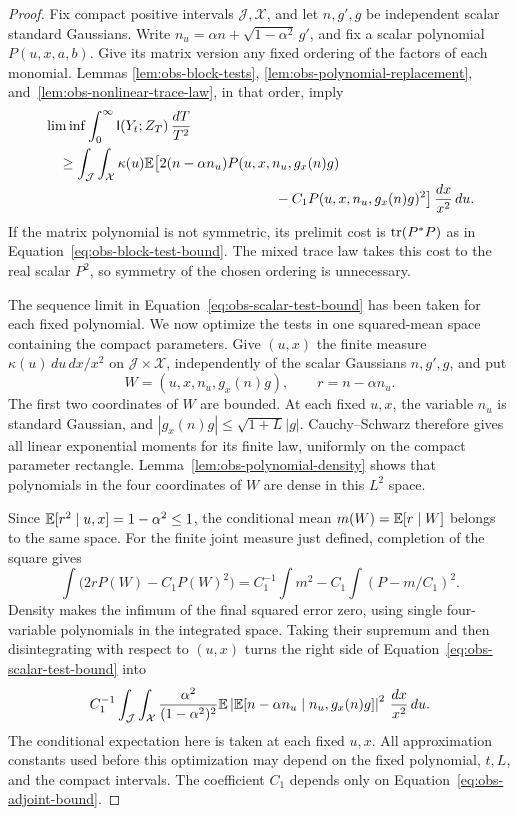 \begin{proof}
Fix compact positive intervals $\mathcal J,\mathcal X$, and let
$n,g',g$ be independent scalar standard Gaussians.  Write
$n_u=\alpha n+\sqrt{1-\alpha^2}\,g'$, and fix a scalar polynomial
$P(u,x,a,b)$.  Give its matrix version any fixed
ordering of the factors of each monomial.  Lemmas
\ref{lem:obs-block-tests}, \ref{lem:obs-polynomial-replacement},
and~\ref{lem:obs-nonlinear-trace-law}, in that order, imply
\begin{align}
 &\liminf\int_0^\infty\MI(Y_t;Z_T)\,\frac{dT}{T^2}
 \notag\\
 &\quad\ge\int_{\mathcal J}\int_{\mathcal X}\kappa(u)
 \E\big[2(n-\alpha n_u)P(u,x,n_u,g_x(n)g)
 \notag\\[-2pt]
 &\hspace{58mm}-C_1P(u,x,n_u,g_x(n)g)^2\big]
       \,\frac{dx}{x^2}\,du.
 \label{eq:obs-scalar-test-bound}
\end{align}
If the matrix polynomial is not symmetric, its prelimit cost is
$\operatorname{tr}(P^*P)$ as in Equation~\eqref{eq:obs-block-test-bound}.
The mixed trace law takes this cost to the real scalar $P^2$,
so symmetry of the chosen ordering is unnecessary.

The sequence limit in Equation~\eqref{eq:obs-scalar-test-bound}
has been taken for each fixed polynomial.  We now optimize the
tests in one squared-mean space containing the compact parameters.
Give $(u,x)$ the finite measure $\kappa(u)\,du\,dx/x^2$ on
$\mathcal J\times\mathcal X$, independently of the scalar
Gaussians $n,g',g$, and put
\begin{equation}\label{eq:obs-scalar-observed-vector}
 W=(u,x,n_u,g_x(n)g),\qquad r=n-\alpha n_u.
\end{equation}
The first two coordinates of $W$ are bounded.  At each fixed
$u,x$, the variable $n_u$ is standard Gaussian, and
$|g_x(n)g|\le\sqrt{1+L}|g|$.
Cauchy--Schwarz therefore gives all linear exponential moments
for its finite law, uniformly on the compact parameter rectangle.
Lemma~\ref{lem:obs-polynomial-density} shows that polynomials in
the four coordinates of $W$ are dense in this $L^2$ space.

Since $\mathbb E[r^2\mid u,x]=1-\alpha^2\le1$, the conditional mean
$m(W)=\mathbb E[r\mid W]$ belongs to the same space.  For the finite
joint measure just defined, completion of the square gives
\[
 \int\big(2rP(W)-C_1P(W)^2\big)
 =C_1^{-1}\int m^2-C_1\int(P-m/C_1)^2.
\]
Density makes the infimum of the final squared error zero, using
single four-variable polynomials in the integrated space.
Taking their supremum and then disintegrating with respect to
$(u,x)$ turns the right side of
Equation~\eqref{eq:obs-scalar-test-bound} into
\begin{equation}\label{eq:obs-scalar-score-lower}
 C_1^{-1}\int_{\mathcal J}\int_{\mathcal X}
 \frac{\alpha^2}{(1-\alpha^2)^2}
 \mathbb E\left|\mathbb E[n-\alpha n_u\mid n_u,g_x(n)g]\right|^2
 \,\frac{dx}{x^2}\,du.
\end{equation}
The conditional expectation here is taken at each fixed $u,x$.
All approximation constants used before this optimization may
depend on the fixed polynomial, $t,L$, and the compact intervals.
The coefficient $C_1$ depends only on
Equation~\eqref{eq:obs-adjoint-bound}.


\end{proof}

